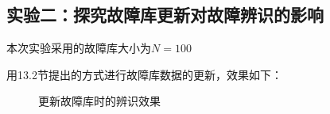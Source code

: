 \documentclass[lang=cn,11pt,a4paper]{elegantpaper}
\begin{document}
\subsection{实验二：探究故障库更新对故障辨识的影响}
\begin{shaded}
	本次实验采用的故障库大小为$N=100$
\end{shaded}
用13.2节提出的方式进行故障库数据的更新，效果如下：
\begin{figure}[H]
	\centering  %
	\caption{更新故障库时的辨识效果}
	\label{Fig.main}
\end{figure}
\end{document}
